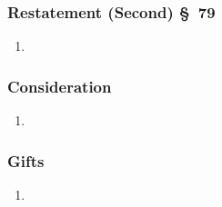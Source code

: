 \subsubsection{Restatement (Second) \S\ 79}

\begin{enumerate}
    \item %
\end{enumerate}

\subsubsection{Consideration}

\begin{enumerate}
    \item %
\end{enumerate}

\subsubsection{Gifts}

\begin{enumerate}
    \item %
\end{enumerate}

